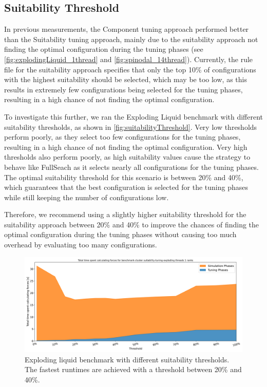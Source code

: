 \subsection{Suitability Threshold}
\label{sec:suitabilityThreshold}

In previous measurements, the Component tuning approach performed better than the Suitability tuning approach, mainly due to the suitability approach not finding the optimal configuration during the tuning phases (see \autoref{fig:explodingLiquid_1thread} and \autoref{fig:spinodal_14thread}).
Currently, the rule file for the suitability approach specifies that only the top 10\% of configurations with the highest suitability should be selected, which may be too low, as this results in extremely few configurations being selected for the tuning phases, resulting in a high chance of not finding the optimal configuration.

To investigate this further, we ran the Exploding Liquid benchmark with different suitability thresholds, as shown in \autoref{fig:suitabilityThreshold}. Very low thresholds perform poorly, as they select too few configurations for the tuning phases, resulting in a high chance of not finding the optimal configuration. Very high thresholds also perform poorly, as high suitability values cause the strategy to behave like FullSeach as it selects nearly all configurations for the tuning phases. The optimal suitability threshold for this scenario is between 20\% and 40\%, which guarantees that the best configuration is selected for the tuning phases while still keeping the number of configurations low.


Therefore, we recommend using a slightly higher suitability threshold for the suitability approach between 20\% and 40\% to improve the chances of finding the optimal configuration during the tuning phases without causing too much overhead by evaluating too many configurations.


\begin{figure}[H]
    \centering
    \includegraphics[width=\columnwidth]{figures/Benchmark/SuitabilitySearch/SuitabilityExploding_timings_threshold_benchmark-cluster_suitability-tuning-exploding_1.png}
    \caption[Exploding liquid benchmark with different suitability thresholds]{Exploding liquid benchmark with different suitability thresholds. The fastest runtimes are achieved with a threshold between 20\% and 40\%.}
    \label{fig:suitabilityThreshold}
\end{figure}

